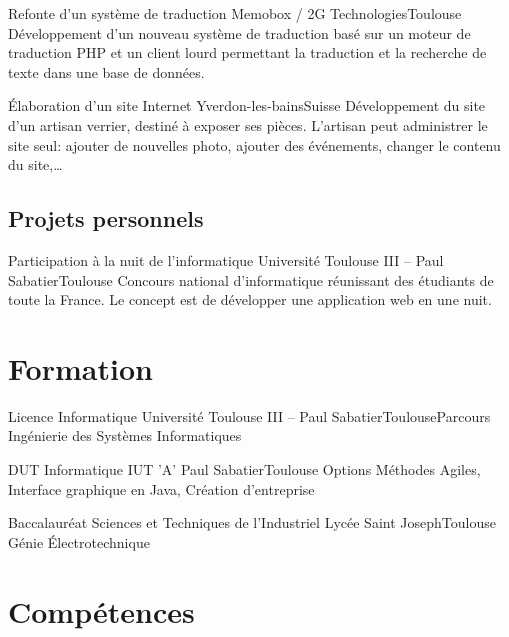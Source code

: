\documentclass{my_cv_bis}
\begin{document}
	{ Refonte d’un système de traduction }
	{Memobox / 2G Technologies}{Toulouse}
	{Développement d'un nouveau système de traduction basé sur un moteur de traduction PHP et un client lourd
	permettant la traduction et la recherche de texte dans une base de données.  } {}

	{Élaboration d’un site Internet}
	{Yverdon-les-bains}{Suisse}
	{Développement du site d’un artisan verrier, destiné à exposer ses pièces. L'artisan peut administrer le site
	seul: ajouter de nouvelles photo, ajouter des événements, changer le contenu du site,\ldots}
	{}

	\subsection{Projets personnels}
	{Participation à la nuit de l'informatique}
	{Université Toulouse III -- Paul Sabatier}{Toulouse}
	{ Concours national d’informatique réunissant des étudiants de toute la France. Le concept est de développer une application web en une nuit.} 
	{}
	\vspace{-20px}
\section{Formation}
	{Licence Informatique}
	{Université Toulouse III -- Paul Sabatier}{Toulouse}{Parcours Ingénierie des Systèmes Informatiques}{}
	
	{DUT Informatique}
	{IUT 'A' Paul Sabatier}{Toulouse}
	{Options Méthodes Agiles, Interface graphique en Java, Création d'entreprise}
	{}
	
	{Baccalauréat Sciences et Techniques de l'Industriel}
	{Lycée Saint Joseph}{Toulouse}
	{Génie Électrotechnique}{}
	\vspace{-20px}
\section{Compétences}
\end{document}
